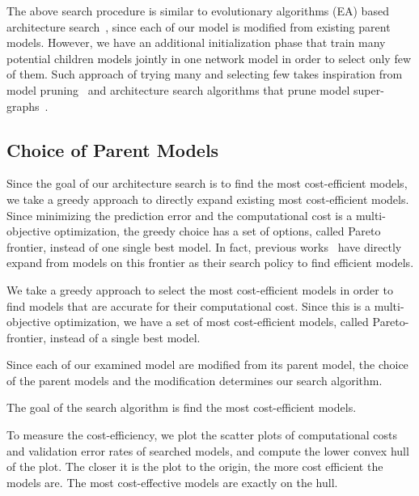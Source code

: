 \documentclass{article}
\begin{document}
The above search procedure is similar to evolutionary algorithms (EA) based architecture search~\citep{Real2018RegularizedEF, Elsken2018EfficientMN}, since each of our model is modified from existing parent models. However, we have an additional initialization phase that train many potential children models jointly in one network model in order to select only few of them. Such approach of trying many and selecting few takes inspiration from model pruning~\citep{huang2017condensenet} and architecture search algorithms that prune model super-graphs~\citep{Pham2018EfficientNA, Liu2018DARTSDA}.




\subsection{Choice of Parent Models}
\label{sec:parent_choice}

Since the goal of our architecture search is to find the most cost-efficient models, we take a greedy approach to directly expand existing most cost-efficient models. Since minimizing the prediction error and the computational cost is a multi-objective optimization, the greedy choice has a set of options, called Pareto frontier, instead of one single best model. In fact, previous works~\citep{Elsken2018EfficientMN, Hsu2018MONASMN} have directly expand from models on this frontier as their search policy to find efficient models. 





We take a greedy approach to select the most cost-efficient models in order to find models that are accurate for their computational cost. Since this is a multi-objective optimization, we have a set of most cost-efficient models, called Pareto-frontier, instead of a single best model. 




Since each of our examined model are modified from its parent model, the choice of the parent models and the modification determines our search algorithm. 



The goal of the search algorithm is find the most cost-efficient models. 


To measure the cost-efficiency, we plot the scatter plots of computational costs and validation error rates of searched models, and compute the lower convex hull of the plot. The closer it is the plot to the origin, the more cost efficient the models are. The most cost-effective models are exactly on the hull. 
\end{document}
